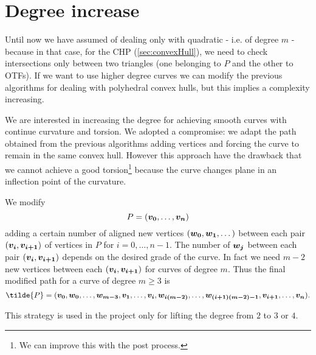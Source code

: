 \documentclass[dissertation.tex]{subfiles}
\begin{document}
\section{Degree increase}\label{sec:degreeInc}
Until now we have assumed of dealing only with quadratic \bss{} -
i.e. of degree $m$ - because
in that case,
for the \ac{CHP} (\cref{sec:convexHull}), we need to check
intersections only between  two triangles (one belonging to $P$ and the
other to \acp{OTF}). If we want to use higher degree
curves we can modify the
previous algorithms for dealing with polyhedral convex hulls, but this
implies a complexity increasing.

We are interested in increasing the degree for achieving smooth
curves with continue curvature and torsion. We adopted a compromise:
we adapt the path obtained from the previous algorithms adding
vertices and forcing the curve to remain in the same convex
hull. However this approach have the drawback that we cannot achieve a
good torsion\footnote{We can improve this with the post process.}
because the curve changes plane in an inflection point of
the curvature.

We modify 
\begin{equation*}
P=(\boldsymbol{v_0},\dots,\boldsymbol{v_n})  
\end{equation*}
adding a certain number of aligned new vertices
$(\boldsymbol{w_0},\boldsymbol{w_1},\dots)$ between each pair 
$(\boldsymbol{v_i},\boldsymbol{v_{i+1}})$ of vertices in $P$ for $i=0,\dots,n-1$. The
number of $\boldsymbol{w_j}$
between each pair $(\boldsymbol{v_i},\boldsymbol{v_{i+1}})$ depends on the desired
grade of the curve. In fact we need $m-2$ new vertices between each
$(\boldsymbol{v_i},\boldsymbol{v_{i+1}})$ for 
  \bs curves of degree $m$.
Thus the final modified path for a \bs curve of degree $m\ge 3$ is
\begin{equation*}
  \tilde{P}=(\ve{v_0},\ve{w_0},\dots,\ve{w_{m-3}},\ve{v_1},\dots,\ve{v_i},\ve{w_{i(m-2)}},\dots,\ve{w_{(i+1)(m-2)-1}},\ve{v_{i+1}},\dots,\ve{v_n}).
\end{equation*}

This strategy  is used in the project only for lifting the degree from $2$ to $3$ or $4$.
\end{document}
